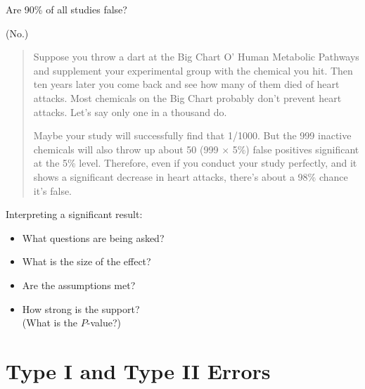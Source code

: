 \begin{frame}{Are 90\% of all studies false?}

        (No.)

    \vspace{2em}
    \pause

    \begin{quote}
        \small
        Suppose you throw a dart at the Big Chart O' Human Metabolic Pathways and supplement your experimental group with the chemical you hit. Then ten years later you come back and see how many of them died of heart attacks.
        Most chemicals on the Big Chart probably don't prevent heart attacks. Let's say only one in a thousand do. 

    \vspace{1em}
        
        \pause Maybe your study will successfully find that 1/1000. But the 999 inactive chemicals will also throw up about 50 (999 $\times$ 5\%) false positives significant at the 5\% level. Therefore, even if you conduct your study perfectly, and it shows a significant decrease in heart attacks, there's about a 98\% chance it's false.
    \end{quote}


\end{frame}

\begin{frame}{Interpreting a significant result:}

    \begin{itemize}
        \item What questions are being asked?
        \item What is the size of the effect?
        \item Are the assumptions met?
        \item How strong is the support?  \\
          (What is the $P$-value?)
    \end{itemize}

\end{frame}

\section{Type I and Type II Errors}


